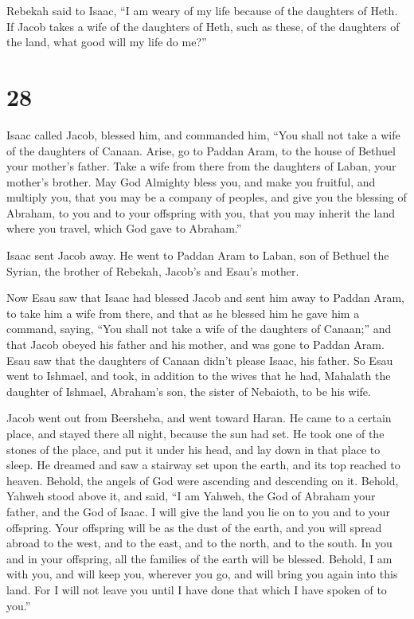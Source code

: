  Rebekah said to Isaac, ``I am weary of my life because of
the daughters of Heth. If Jacob takes a wife of the daughters of Heth,
such as these, of the daughters of the land, what good will my life do
me?''

\hypertarget{section-27}{%
\section{28}\label{section-27}}

 Isaac called Jacob, blessed him, and commanded him, ``You
shall not take a wife of the daughters of Canaan.  Arise, go
to Paddan Aram, to the house of Bethuel your mother's father. Take a
wife from there from the daughters of Laban, your mother's brother.
 May God Almighty bless you, and make you fruitful, and
multiply you, that you may be a company of peoples,  and
give you the blessing of Abraham, to you and to your offspring with you,
that you may inherit the land where you travel, which God gave to
Abraham.''

 Isaac sent Jacob away. He went to Paddan Aram to Laban, son
of Bethuel the Syrian, the brother of Rebekah, Jacob's and Esau's
mother.

 Now Esau saw that Isaac had blessed Jacob and sent him away
to Paddan Aram, to take him a wife from there, and that as he blessed
him he gave him a command, saying, ``You shall not take a wife of the
daughters of Canaan;''  and that Jacob obeyed his father and
his mother, and was gone to Paddan Aram.  Esau saw that the
daughters of Canaan didn't please Isaac, his father.  So
Esau went to Ishmael, and took, in addition to the wives that he had,
Mahalath the daughter of Ishmael, Abraham's son, the sister of Nebaioth,
to be his wife.

 Jacob went out from Beersheba, and went toward Haran.
 He came to a certain place, and stayed there all night,
because the sun had set. He took one of the stones of the place, and put
it under his head, and lay down in that place to sleep.  He
dreamed and saw a stairway set upon the earth, and its top reached to
heaven. Behold, the angels of God were ascending and descending on it.
 Behold, Yahweh stood above it, and said, ``I am Yahweh,
the God of Abraham your father, and the God of Isaac. I will give the
land you lie on to you and to your offspring.  Your
offspring will be as the dust of the earth, and you will spread abroad
to the west, and to the east, and to the north, and to the south. In you
and in your offspring, all the families of the earth will be blessed.
 Behold, I am with you, and will keep you, wherever you go,
and will bring you again into this land. For I will not leave you until
I have done that which I have spoken of to you.''

